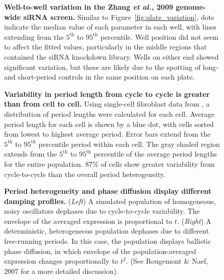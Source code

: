 \documentclass[11pt, letterpaper]{article}
\begin{document}
\begin{figure}[tbp]
  \begin{center}
  \end{center}
  \caption{{\bfseries Well-to-well variation in the Zhang {\itshape et al.,} 2009 genome-wide siRNA screen.} Similar to Figure~\ref{fig:plate_variation}, dots indicate the median value of each parameter in each well, with lines extending from the $5^\text{th}$ to $95^\text{th}$ percentile. Well position did not seem to affect the fitted values, particularly in the middle regions that contained the siRNA knockdown library. Wells on either end showed significant variation, but these are likely due to the spotting of long- and short-period controls in the same position on each plate.}
\label{fig:well_variation}
\end{figure}

\begin{figure}[tbp]
  \begin{center}
  \end{center}
  \caption{{\bfseries Variability in period length from cycle to cycle is greater than from cell to cell.} Using single-cell fibroblast data from \cite{Leise2012}, a distribution of period lengths were calculated for each cell. Average period length for each cell is shown by a blue dot, with cells sorted from lowest to highest average period. Error bars extend from the $5^\text{th}$ to $95^\text{th}$ percentile period within each cell. The gray shaded region extends from the $5^\text{th}$ to $95^\text{th}$ percentile of the average period lengths for the entire population. $87\%$ of cells show greater variability from cycle-to-cycle than the overall period heterogeneity.}
  \label{fig:cell2cell-variability}
\end{figure}

\begin{figure}[tbp]
  \begin{center}
  \end{center}
  \caption{{\bfseries Period heterogeneity and phase diffusion display different damping profiles.} ({\itshape Left}) A simulated population of homogeneous, noisy oscillators dephases due to cycle-to-cycle variability. The envelope of the averaged expression is proportional to $t$.
  ({\itshape Right}) A deterministic, heterogeneous population dephases due to different free-running periods. In this case, the population displays ballistic phase diffusion, in which envelope of the population-averaged expression changes proportionally to $t^2$. (See Rougemont \& Naef, 2007 \cite{Rougemont2007} for a more detailed discussion).}
  \label{fig:dephasing-rates}
\end{figure}
\end{document}
